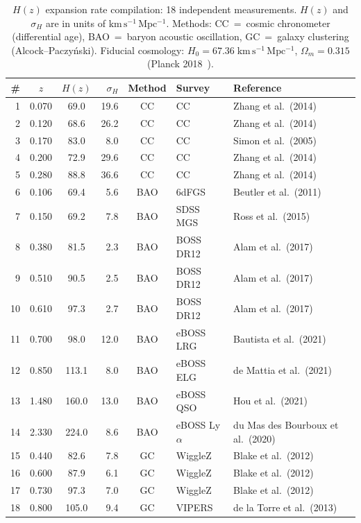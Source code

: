 \begin{table}[htbp]
\centering
\caption{$H(z)$ expansion rate compilation: 18 independent measurements. $H(z)$ and $\sigma_H$ are in units of $\mathrm{km\,s^{-1}\,Mpc^{-1}}$. Methods: CC~=~cosmic chronometer (differential age), BAO~=~baryon acoustic oscillation, GC~=~galaxy clustering (Alcock--Paczy\'nski). Fiducial cosmology: $H_0 = 67.36\;\mathrm{km\,s^{-1}\,Mpc^{-1}}$, $\Omega_m = 0.315$ (Planck 2018~\cite{ch2:Planck2018}).}
\label{tab:2-HK-data}
\small
\begin{tabular}{rccrcll}
\toprule
\# & $z$ & $H(z)$ & $\sigma_H$ & Method & Survey & Reference \\
\midrule
1 & 0.070 &  69.0 & 19.6 & CC  & CC          & Zhang et al.\ (2014)~\cite{ch2:Zhang2014} \\
2 & 0.120 &  68.6 & 26.2 & CC  & CC          & Zhang et al.\ (2014)~\cite{ch2:Zhang2014} \\
3 & 0.170 &  83.0 &  8.0 & CC  & CC          & Simon et al.\ (2005)~\cite{ch2:Simon2005} \\
4 & 0.200 &  72.9 & 29.6 & CC  & CC          & Zhang et al.\ (2014)~\cite{ch2:Zhang2014} \\
5 & 0.280 &  88.8 & 36.6 & CC  & CC          & Zhang et al.\ (2014)~\cite{ch2:Zhang2014} \\
6 & 0.106 &  69.4 &  5.6 & BAO & 6dFGS       & Beutler et al.\ (2011)~\cite{ch2:Beutler2011} \\
7 & 0.150 &  69.2 &  7.8 & BAO & SDSS MGS    & Ross et al.\ (2015)~\cite{ch2:Ross2015} \\
8 & 0.380 &  81.5 &  2.3 & BAO & BOSS DR12   & Alam et al.\ (2017)~\cite{ch2:BOSS2017} \\
9 & 0.510 &  90.5 &  2.5 & BAO & BOSS DR12   & Alam et al.\ (2017)~\cite{ch2:BOSS2017} \\
10 & 0.610 &  97.3 &  2.7 & BAO & BOSS DR12  & Alam et al.\ (2017)~\cite{ch2:BOSS2017} \\
11 & 0.700 &  98.0 & 12.0 & BAO & eBOSS LRG  & Bautista et al.\ (2021)~\cite{ch2:Bautista2021} \\
12 & 0.850 & 113.1 &  8.0 & BAO & eBOSS ELG  & de Mattia et al.\ (2021)~\cite{ch2:deMattia2021} \\
13 & 1.480 & 160.0 & 13.0 & BAO & eBOSS QSO  & Hou et al.\ (2021)~\cite{ch2:Hou2021} \\
14 & 2.330 & 224.0 &  8.6 & BAO & eBOSS Ly$\alpha$ & du Mas des Bourboux et al.\ (2020)~\cite{ch2:duMas2020} \\
15 & 0.440 &  82.6 &  7.8 & GC  & WiggleZ    & Blake et al.\ (2012)~\cite{ch2:Blake2012} \\
16 & 0.600 &  87.9 &  6.1 & GC  & WiggleZ    & Blake et al.\ (2012)~\cite{ch2:Blake2012} \\
17 & 0.730 &  97.3 &  7.0 & GC  & WiggleZ    & Blake et al.\ (2012)~\cite{ch2:Blake2012} \\
18 & 0.800 & 105.0 &  9.4 & GC  & VIPERS     & de la Torre et al.\ (2013)~\cite{ch2:delaTorre2013} \\
\bottomrule
\end{tabular}
\end{table}

